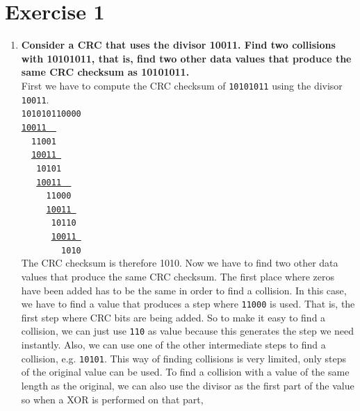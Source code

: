 \documentclass[twoside, a4paper, fleqn, reqno]{article}
\begin{document}
\maketitle

\section*{Exercise 1}
\begin{enumerate}
	\item\textbf{Consider a CRC that uses the divisor 10011. Find two collisions with
	10101011, that is, find two other data values that produce the same
	CRC checksum as 10101011.}
	\\First we have to compute the CRC checksum of \texttt{10101011} using the divisor \texttt{10011}.
	\\\texttt{\phantom{}10101011\color{red}0000}
	\\\texttt{\phantom{}\underline{10011~~}~~~~~}
	\\\texttt{\phantom{}~~11001~~~~~}
	\\\texttt{\phantom{}~~\underline{10011~}~~~~}
	\\\texttt{\phantom{}~~~10101~~~~}
	\\\texttt{\phantom{}~~~\underline{10011~~}~~}
	\\\texttt{\phantom{}~~~~~110\color{red}00~~}
	\\\texttt{\phantom{}~~~~~\underline{100\color{red}11~}~}
	\\\texttt{\phantom{}~~~~~~10\color{red}110~}
	\\\texttt{\phantom{}~~~~~~\underline{10\color{red}011~}}
	\\\texttt{\phantom{}~~~~~~~~\color{red}1010}
	\\The CRC checksum is therefore 1010.
	Now we have to find two other data values that produce the same CRC checksum.
	The first place where zeros have been added has to be the same in order to
	find a collision. In this case, we have to find a value that produces a 
	step where \texttt{110\color{red}00} is used. That is, the first step where
	CRC bits are being added. So to make it easy to find a collision,
	we can just use \texttt{110} as value because this generates the step we need instantly.
	Also, we can use one of the other intermediate steps to find a collision, e.g. \texttt{10101}.
	This way of finding collisions is very limited, only steps of the original value can be used.
	To find a collision with a value of the same length as the original, we can also
	use the divisor as the first part of the value so when a XOR is performed on that part,

\end{enumerate}
\end{document}
